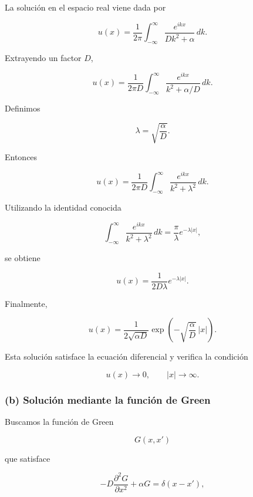 \documentclass[11pt,spanish]{article}
\begin{document}
La solución en el espacio real viene dada por

\begin{equation}
u(x)
=
\frac{1}{2\pi}
\int_{-\infty}^{\infty}
\frac{e^{ikx}}
{Dk^2+\alpha}\,dk.
\end{equation}

Extrayendo un factor $D$,

\[
u(x)
=
\frac{1}{2\pi D}
\int_{-\infty}^{\infty}
\frac{e^{ikx}}
{k^2+\alpha/D}\,dk.
\]

Definimos

\begin{equation}
\lambda=\sqrt{\frac{\alpha}{D}}.
\end{equation}

Entonces

\begin{equation}
u(x)
=
\frac{1}{2\pi D}
\int_{-\infty}^{\infty}
\frac{e^{ikx}}
{k^2+\lambda^2}\,dk.
\end{equation}

Utilizando la identidad conocida

\begin{equation}
\int_{-\infty}^{\infty}
\frac{e^{ikx}}
{k^2+\lambda^2}\,dk
=
\frac{\pi}{\lambda}
e^{-\lambda|x|},
\end{equation}

se obtiene

\begin{equation}
u(x)
=
\frac{1}{2D\lambda}
e^{-\lambda|x|}.
\end{equation}

Finalmente,

\begin{equation}
\boxed{
u(x)
=
\frac{1}{2\sqrt{\alpha D}}
\exp\!\left(
-\sqrt{\frac{\alpha}{D}}\,|x|
\right).
}
\end{equation}

Esta solución satisface la ecuación diferencial y verifica la condición

\[
u(x)\rightarrow0,
\qquad
|x|\rightarrow\infty.
\]

\subsubsection*{(b) Solución mediante la función de Green}

Buscamos la función de Green

\[
G(x,x')
\]

que satisface

\begin{equation}
-D\frac{\partial^2G}{\partial x^2}
+\alpha G
=
\delta(x-x'),
\end{equation}
\end{document}
